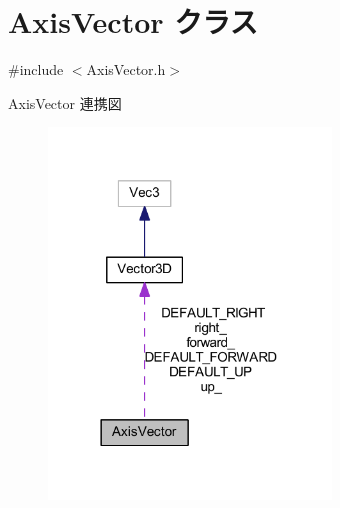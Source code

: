 \hypertarget{class_axis_vector}{}\section{Axis\+Vector クラス}
\label{class_axis_vector}


{\ttfamily \#include $<$Axis\+Vector.\+h$>$}



Axis\+Vector 連携図\nopagebreak
\begin{figure}[H]
\begin{center}
\leavevmode
\includegraphics[width=213pt]{class_axis_vector__coll__graph}
\end{center}
\end{figure}
